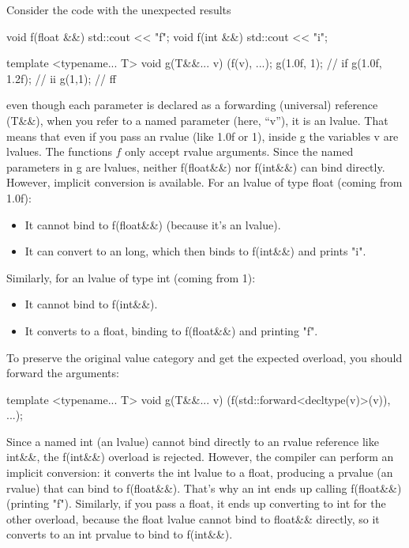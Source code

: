 \documentclass{report}
\begin{document}
\pagebreak 
{}
\bigbreak \noindent 
Consider the code with the unexpected results 
\bigbreak \noindent 
\begin{cppcode}
    void f(float &&) { std::cout << "f"; }
    void f(int &&) { std::cout << "i"; }

    template <typename... T>
    void g(T&&... v)
    {
        (f(v), ...);
    }
    g(1.0f, 1); // if
    g(1.0f, 1.2f); // ii
    g(1,1); // ff
\end{cppcode}
\bigbreak \noindent 
even though each parameter is declared as a forwarding (universal) reference (T\&\&), when you refer to a named parameter (here, “v”), it is an lvalue. That means that even if you pass an rvalue (like 1.0f or 1), inside g the variables v are lvalues.
\bigbreak \noindent 
The functions $f$ only accept rvalue arguments. Since the named parameters in g are lvalues, neither f(float\&\&) nor f(int\&\&) can bind directly. However, implicit conversion is available. For an lvalue of type float (coming from 1.0f):
\begin{itemize}
    \item It cannot bind to f(float\&\&) (because it’s an lvalue).
    \item It can convert to an long, which then binds to f(int\&\&) and prints "i".
\end{itemize}
\bigbreak \noindent 
Similarly, for an lvalue of type int (coming from 1):
\begin{itemize}
    \item It cannot bind to f(int\&\&).
    \item It converts to a float, binding to f(float\&\&) and printing "f".
\end{itemize}
\bigbreak \noindent 
To preserve the original value category and get the expected overload, you should forward the arguments:
\bigbreak \noindent 
\begin{cppcode}
    template <typename... T>
    void g(T&&... v) {
        (f(std::forward<decltype(v)>(v)), ...);
    }
\end{cppcode}
\bigbreak \noindent 
Since a named int (an lvalue) cannot bind directly to an rvalue reference like int\&\&, the f(int\&\&) overload is rejected. However, the compiler can perform an implicit conversion: it converts the int lvalue to a float, producing a prvalue (an rvalue) that can bind to f(float\&\&). That’s why an int ends up calling f(float\&\&) (printing "f").
\bigbreak \noindent 
Similarly, if you pass a float, it ends up converting to int for the other overload, because the float lvalue cannot bind to float\&\& directly, so it converts to an int prvalue to bind to f(int\&\&).
\end{document}
